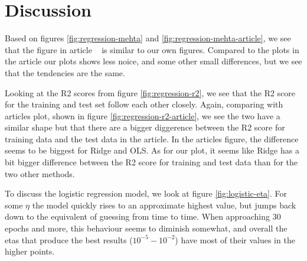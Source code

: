 \section{Discussion}
Based on figures \ref{fig:regression-mehta} and 
\ref{fig:regression-mehta-article}, we see that the figure in article 
~\cite{HighBias} is similar to our own figures. 
Compared to the plots in the article our plots shows less noice, 
and some other small differences, but we see that the tendencies are the same.

Looking at the R2 scores from figure \ref{fig:regression-r2}, we see 
that the R2 score for the training and test set follow each other closely. 
Again, comparing with articles plot, shown in figure 
\ref{fig:regression-r2-article}, we see the two have a similar shape 
but that there are a bigger diggerence between the R2 score for training 
data and the test data in the article. 
In the articles figure, the difference seems to be biggest for Ridge and 
OLS. As for our plot, it seems like Ridge has a bit bigger difference 
between the R2 score for training and test data than for the two other 
methods.

To discuss the logistic regression model, 
we look at figure \ref{fig:logistic-eta}. For some $\eta$ the model 
quickly rises to an approximate highest value, but jumps back down to 
the equivalent of guessing from time
to time. When approaching 30 epochs and more, this behaviour 
seems to diminish somewhat, and overall the etas that produce 
the best results ($10^{-5} - 10^{-2}$) have most of their values
in the higher points.



